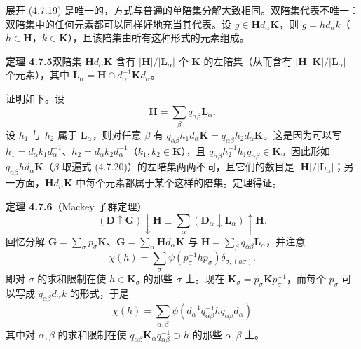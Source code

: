 展开 (4.7.19) 是唯一的，方式与普通的单陪集分解大致相同。双陪集代表不唯一：双陪集中的任何元素都可以同样好地充当其代表。设 $g \in \mathbf{H}d_{\alpha}\mathbf{K}$，则 $g = hd_{\alpha}k$（$h \in \mathbf{H}$，$k \in \mathbf{K}$），且该陪集由所有这种形式的元素组成。

\noindent\textbf{定理 4.7.5}\quad 双陪集 $\mathbf{H}d_{\alpha}\mathbf{K}$ 含有 $|\mathbf{H}|/|\mathbf{L}_{\alpha}|$ 个 $\mathbf{K}$ 的左陪集（从而含有 $|\mathbf{H}||\mathbf{K}|/|\mathbf{L}_{\alpha}|$ 个元素），其中 $\mathbf{L}_{\alpha} = \mathbf{H} \cap d^{-1}_{\alpha}\mathbf{K}d_{\alpha}$。

证明如下。设
\begin{equation*}
\mathbf{H} = \sum_{\beta}q_{\alpha\beta}\mathbf{L}_{\alpha}.
\tag{4.7.20}
\end{equation*}
设 $h_{1}$ 与 $h_{2}$ 属于 $\mathbf{L}_{\alpha}$，则对任意 $\beta$ 有 $q_{\alpha\beta}h_{1}d_{\alpha}\mathbf{K} = q_{\alpha\beta}h_{2}d_{\alpha}\mathbf{K}$。这是因为可以写 $h_{1} = d_{\alpha}k_{1}d^{-1}_{\alpha}$、$h_{2} = d_{\alpha}k_{2}d^{-1}_{\alpha}$（$k_{1}, k_{2} \in \mathbf{K}$），且 $q_{\alpha\beta}h_{2}^{-1}h_{1}q_{\alpha\beta} \in \mathbf{K}$。因此形如 $q_{\alpha\beta}hd_{\alpha}\mathbf{K}$（$\beta$ 取遍式 (4.7.20)）的左陪集两两不同，且它们的数目是 $|\mathbf{H}|/|\mathbf{L}_{\alpha}|$；另一方面，$\mathbf{H}d_{\alpha}\mathbf{K}$ 中每个元素都属于某个这样的陪集。定理得证。

\noindent\textbf{定理 4.7.6}\quad （Mackey 子群定理）
\begin{equation*}
(\mathbf{D} \uparrow \mathbf{G}) \downarrow \mathbf{H} \equiv \sum_{\alpha}(\mathbf{D}_{\alpha} \downarrow \mathbf{L}_{\alpha}) \uparrow \mathbf{H}.
\tag{4.7.21}
\end{equation*}
回忆分解 $\mathbf{G} = \sum_{\sigma}p_{\sigma}\mathbf{K}$、$\mathbf{G} = \sum_{\alpha}\mathbf{H}d_{\alpha}\mathbf{K}$ 与 $\mathbf{H} = \sum_{\beta}q_{\alpha\beta}\mathbf{L}_{\alpha}$，并注意
\begin{equation*}
\chi(h) = \sum_{\sigma}\psi(p^{-1}_{\sigma}hp_{\sigma})\delta_{\sigma, (h\sigma)}.
\tag{4.7.22}
\end{equation*}
即对 $\sigma$ 的求和限制在使 $h \in \mathbf{K}_{\sigma}$ 的那些 $\sigma$ 上。现在 $\mathbf{K}_{\sigma} = p_{\sigma}\mathbf{K}p^{-1}_{\sigma}$，而每个 $p_{\sigma}$ 可以写成 $q_{\alpha\beta}d_{\alpha}k$ 的形式，于是
\begin{equation*}
\chi(h) = \sum_{\alpha, \beta}\psi\left(d^{-1}_{\alpha}q^{-1}_{\alpha\beta}hq_{\alpha\beta}d_{\alpha}\right)
\tag{4.7.23}
\end{equation*}
其中对 $\alpha, \beta$ 的求和限制在使 $q_{\alpha\beta}\mathbf{K}_{\alpha}q^{-1}_{\alpha\beta} \supset h$ 的那些 $\alpha, \beta$ 上。

